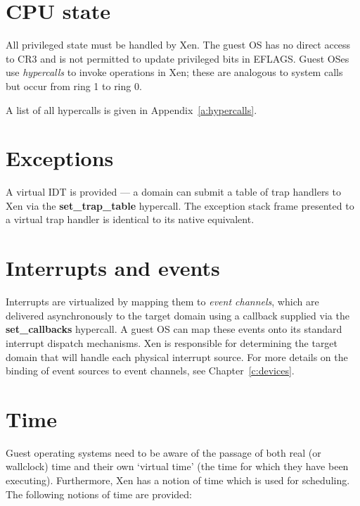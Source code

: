 \documentclass[11pt,twoside,final,openright,a4paper]{report}
\begin{document}
\section{CPU state}

All privileged state must be handled by Xen.  The guest OS has no
direct access to CR3 and is not permitted to update privileged bits in
EFLAGS. Guest OSes use \emph{hypercalls} to invoke operations in Xen;
these are analogous to system calls but occur from ring 1 to ring 0.

A list of all hypercalls is given in Appendix~\ref{a:hypercalls}.


\section{Exceptions}

A virtual IDT is provided --- a domain can submit a table of trap
handlers to Xen via the {\bf set\_trap\_table} hypercall.  The
exception stack frame presented to a virtual trap handler is identical
to its native equivalent.


\section{Interrupts and events}

Interrupts are virtualized by mapping them to \emph{event channels},
which are delivered asynchronously to the target domain using a callback
supplied via the {\bf set\_callbacks} hypercall.  A guest OS can map
these events onto its standard interrupt dispatch mechanisms.  Xen is
responsible for determining the target domain that will handle each
physical interrupt source. For more details on the binding of event
sources to event channels, see Chapter~\ref{c:devices}.


\section{Time}

Guest operating systems need to be aware of the passage of both real
(or wallclock) time and their own `virtual time' (the time for which
they have been executing). Furthermore, Xen has a notion of time which
is used for scheduling. The following notions of time are provided:
\end{document}
